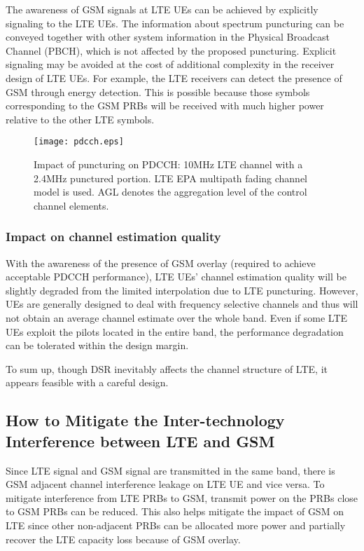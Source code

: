 \documentclass[10pt,journal]{IEEEtran}
\theoremstyle{slplain}
\begin{document}
The awareness of GSM signals at LTE UEs can be achieved by explicitly signaling to the LTE UEs. The information about spectrum puncturing can be conveyed together with other system information in the Physical Broadcast Channel (PBCH), which is not affected by the proposed puncturing. Explicit signaling may be avoided at the cost of additional complexity in the receiver design of LTE UEs. For example, the LTE receivers can detect the presence of GSM through energy detection. This is possible because those symbols corresponding to the GSM PRBs will be received with much higher power relative to the other LTE symbols.



\begin{figure}
\centering
\texttt{[image: pdcch.eps]}
\caption{Impact of puncturing on PDCCH: 10MHz LTE channel with a 2.4MHz punctured portion. LTE EPA multipath fading channel model is used. AGL denotes the aggregation level of the control channel elements.}
\label{fig:pdcch}
\end{figure}

\subsubsection{Impact on channel estimation quality} With the awareness of the presence of GSM overlay (required to achieve acceptable PDCCH performance), LTE UEs' channel estimation quality will be slightly degraded from the limited interpolation due to LTE puncturing. However, UEs are generally designed to deal with frequency selective channels and thus will not obtain an average channel estimate over the whole band. Even if some LTE UEs exploit the pilots located in the entire band, the performance degradation can be tolerated within the design margin.

To sum up, though DSR inevitably affects the channel structure of LTE, it appears feasible with a careful design. 



\subsection{How to Mitigate the Inter-technology Interference between LTE and GSM}


Since LTE signal and GSM signal are transmitted in the same band, there is GSM adjacent channel interference leakage on LTE UE and vice versa. To mitigate interference from LTE PRBs to GSM, transmit power on the PRBs close to GSM PRBs can be reduced. This also helps mitigate the impact of GSM on LTE since other non-adjacent PRBs can be allocated more power and partially recover the LTE capacity loss because of GSM overlay.
\end{document}

